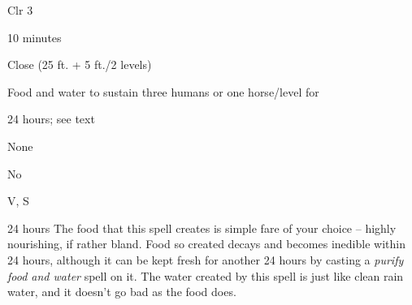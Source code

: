 
\begin{description*}
\item[Level:] Clr 3
\item[Casting Time:] 10 minutes
\item[Range:] Close (25 ft. + 5 ft./2 levels)
\item[Effect:] Food and water to sustain three humans or one horse/level for
\item[Duration:] 24 hours; see text
\item[Saving Throw:] None
\item[Spell Resistance:] No
\item[Components:] V, S
\end{description*}

24 hours
The food that this spell creates is simple fare of your choice -- highly nourishing,
if rather bland. Food so created decays and becomes inedible within 24 hours, although
it can be kept fresh for another 24 hours by casting a \textit{purify food and
water} spell on it. The water created by this spell is just like clean rain water,
and it doesn't go bad as the food does.